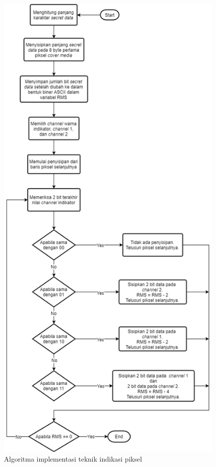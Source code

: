 \documentclass[a4paper,twoside]{article}
\begin{document}
\begin{enumerate}
\begin{itemize}
		\begin{figure}[!htbp]
		\centering
		\includegraphics[scale=0.5]{PIT.png}
		\caption{Algoritma implementasi teknik indikasi piksel}
		\label{imagePIT}
		\end{figure}
			

\end{itemize}
\end{enumerate}
\end{document}
